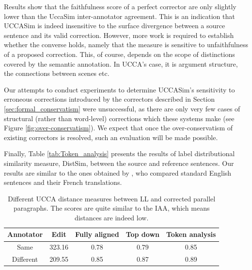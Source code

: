 \documentclass[letter,11pt]{article}
\begin{document}
Results show that the faithfulness score of a perfect corrector are only slightly
lower than the {\sc UccaSim} inter-annotator agreement.
This is an indication that {\sc UCCASim} is indeed
insensitive to the surface divergence between a source sentence and its valid correction.
However, more work is required to establish whether the converse holds,
namely that the measure is sensitive
to unfaithfulness of a proposed correction.
This, of course, depends on the scope of distinctions covered by the semantic annotation.
In UCCA's case, it is argument structure, the connections between scenes etc.

Our attempts to conduct experiments to determine {\sc UCCASim}'s sensitivity to erroneous
corrections introduced by the correctors described in Section \ref{sec:formal_conservatism} were
unsuccessful, as there are only very few cases of structural (rather than word-level)
corrections which these systems make (see Figure \ref{fig:over-conservatism}).
We expect that once the over-conservatism of existing correctors is resolved,
such an evaluation will be made possible.


Finally, Table \ref{tab:Token_analysis} presents the results of label distributional
similarity measure, {\sc DistSim}, between the source and reference sentences.
Our results are similar to the ones obtained by ,
who compared standard English sentences and their French translations.


\begin{table}[h!]
  \centering
  \singlespacing
  \begin{tabular}{c|c|c|c|c}
    Annotator & Edit & Fully aligned & Top down & Token analysis
    \\
    \hline
    Same & 323.16 & 0.78 & 0.79 & 0.85
    \\
    Different & 209.55 & 0.85 & 0.87 & 0.89
    \\
  \end{tabular}
  \caption{Different UCCA distance measures between LL and corrected parallel paragraphs. The scores are quite similar to the IAA, which means distances are indeed low.\label{tab:Distances}}
\end{table}
\end{document}
